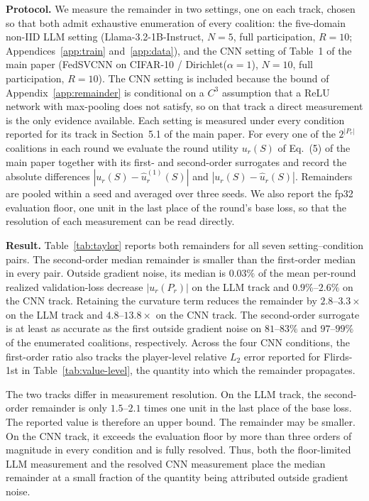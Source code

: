 \documentclass[letterpaper]{article} %
\theoremstyle{definition}
\begin{document}
\noindent\textbf{Protocol.} We measure the remainder in two settings, one on each track,
chosen so that both admit exhaustive enumeration of every coalition: the five-domain
non-IID LLM setting (Llama-3.2-1B-Instruct, $N{=}5$, full participation,
$R{=}10$; Appendices~\ref{app:train} and~\ref{app:data}), and the
CNN setting of Table~1 of the main paper (FedSVCNN on CIFAR-10 /
Dirichlet($\alpha{=}1$), $N{=}10$, full participation, $R{=}10$). The CNN
setting is included because the bound of
Appendix~\ref{app:remainder} is conditional on a $C^3$ assumption that a ReLU
network with max-pooling does not satisfy, so on that track a direct
measurement is the only evidence available. Each setting is measured under
every condition
reported for its track in Section~5.1 of the main paper. For every one of the
$2^{|P_r|}$ coalitions in each round we evaluate the round utility $u_r(S)$ of
Eq.~(5) of the main paper together with its first- and second-order surrogates
and record the absolute differences $|u_r(S) - \hat u_r^{(1)}(S)|$ and
$|u_r(S) - \hat u_r(S)|$. Remainders are pooled within a seed and averaged over
three seeds. We also report the fp32 evaluation floor, one unit in the last
place of the round's base loss, so that the resolution of each measurement can
be read directly.

\noindent\textbf{Result.} Table~\ref{tab:taylor} reports both remainders for all seven
setting--condition pairs. The second-order median remainder is smaller than the
first-order median in every pair. Outside gradient noise, its median is $0.03\%$ of
the mean per-round realized validation-loss decrease $|u_r(P_r)|$ on the LLM
track and $0.9\%$--$2.6\%$ on the CNN track. Retaining the curvature term
reduces the remainder by $2.8$--$3.3\times$ on the LLM track and
$4.8$--$13.8\times$ on the CNN track. The second-order surrogate is at least
as accurate as the first outside gradient noise on $81$--$83\%$ and
$97$--$99\%$ of the enumerated coalitions, respectively. Across the four CNN
conditions, the first-order
ratio also tracks the player-level relative $L_2$ error reported for
Flirds-1st in Table~\ref{tab:value-level}, the quantity into which the
remainder propagates.

The two tracks differ in measurement resolution. On the LLM track, the
second-order remainder is only $1.5$--$2.1$ times one unit in the last place of
the base loss. The reported value is therefore an upper bound. The
remainder may be smaller. On the CNN track, it exceeds the evaluation floor by
more than three orders of magnitude in every condition and is fully resolved.
Thus, both the floor-limited LLM measurement and the resolved CNN measurement
place the median remainder at a small fraction of the quantity being attributed
outside gradient noise.
\end{document}
